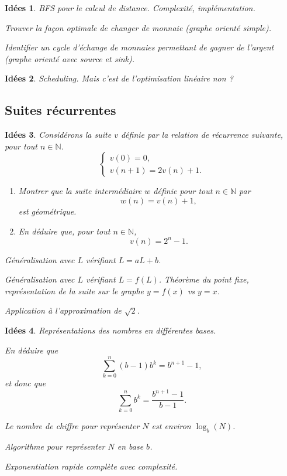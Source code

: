 \documentclass[a4paper,12pt, notitlepage]{article}
\theoremstyle{plain}
\newtheorem{idee}{Idées}
\newcommand{\N}{\mathbb{N}}
\begin{document}
\begin{idee}
	BFS pour le calcul de distance. Complexité, implémentation.
	
	Trouver la façon optimale de changer de monnaie (graphe orienté simple).
	
	Identifier un cycle d'échange de monnaies permettant de gagner de l'argent (graphe orienté avec source et sink).
\end{idee}

\begin{idee}
	Scheduling. Mais c'est de l'optimisation linéaire non ?
\end{idee}

\subsection{Suites récurrentes}

\begin{idee}
	Considérons la suite $v$ définie par la relation de récurrence suivante, pour tout $n\in\N$.
    \[
    \begin{cases}
        v(0) = 0, \\
        v(n+1) = 2v(n) + 1.
    \end{cases}
    \]
    \begin{enumerate}
        \item Montrer que la suite intermédiaire $w$ définie pour tout $n\in\N$ par
            \[ w(n) = v(n) + 1,\]
        est géométrique.
        \item En déduire que, pour tout $n\in\N$,
            \[ v(n) = 2^n - 1.\]
    \end{enumerate}
    
	Généralisation avec $L$ vérifiant $L = aL + b$.
	
	Généralisation avec $L$ vérifiant $L = f(L)$.
	Théorème du point fixe, représentation de la suite sur le graphe $y=f(x)$ vs $y=x$.
	
	Application à l'approximation de $\sqrt{2}$.
\end{idee}

\begin{idee}
	Représentations des nombres en différentes bases.
	
	En déduire que 
		\[ \sum_{k=0}^{n} (b-1)b^k = b^{n+1} - 1, \]
	et donc que 
		\[ \sum_{k=0}^n b^k = \dfrac{b^{n+1} - 1}{b-1}. \]
	
	Le nombre de chiffre pour représenter $N$ est environ $\log_b(N)$. 
	
	Algorithme pour représenter $N$ en base $b$.
	
	Exponentiation rapide complète avec complexité.
\end{idee}
\end{document}
